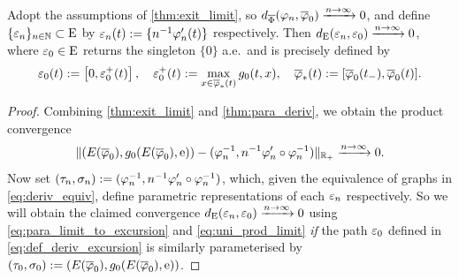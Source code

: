\begin{theorem}\label{cor:hausdorff_deriv}
    Adopt the assumptions of \autoref{thm:exit_limit}, so $d_{\overline{\Phi}}(\varphi_n,\overline{\varphi}_0)\xrightarrow{n\to\infty}0$, and define $\{\varepsilon_n\}_{n\in\mathbb{N}}\subset\mathrm{E}$ by $\varepsilon_n(t):=\{n^{-1}\varphi'_n(t)\}$ respectively. Then $d_{\mathrm{E}}(\varepsilon_n,\varepsilon_0)\xrightarrow{n\to\infty}0$, where $\varepsilon_0\in\mathrm{E}$ returns the singleton $\{0\}$ a.e.~and is precisely defined by
    \begin{equation}\label{eq:def_deriv_excursion}
        \varepsilon_0(t) := \left[0, \varepsilon_0^+(t)\right],\quad \varepsilon_0^+(t):=\max_{x\in\overline{\varphi}_*(t)} g_0(t,x),\quad \overline{\varphi}_*(t):=[\overline{\varphi}_0(t_-),\overline{\varphi}_0(t)].
    \end{equation}
\end{theorem}
\begin{proof}
    Combining \autoref{thm:exit_limit} and \autoref{thm:para_deriv}, we obtain the product convergence
    \begin{equation}\label{eq:uni_prod_limit}
        \Vert(E(\overline{\varphi}_0),g_0(E(\overline{\varphi}_0),\mathrm{e})) - (\varphi_n^{-1},n^{-1}\varphi'_n\circ\varphi_n^{-1})\Vert_{\mathbb{R}_+}\xrightarrow{n\to\infty}0.
    \end{equation}
    Now set $(\tau_n,\sigma_n):=(\varphi_n^{-1},n^{-1}\varphi'_n\circ\varphi_n^{-1})$, which, given the equivalence of graphs in \autoref{eq:deriv_equiv}, define parametric representations of each $\varepsilon_n$ respectively. So we will obtain the claimed convergence $d_{\mathrm{E}}(\varepsilon_n,\varepsilon_0)\xrightarrow{n\to\infty}0$ using \autoref{eq:para_limit_to_excursion} and \autoref{eq:uni_prod_limit} \emph{if} the path $\varepsilon_0$ defined in \autoref{eq:def_deriv_excursion} is similarly parameterised by $(\tau_0,\sigma_0):=(E(\overline{\varphi}_0),g_0(E(\overline{\varphi}_0),\mathrm{e}))$.


\end{proof}
